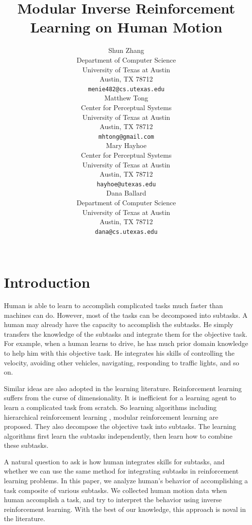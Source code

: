 \documentclass[11pt]{article} %
\title{Modular Inverse Reinforcement Learning on Human Motion}
\author{
Shun Zhang\\
Department of Computer Science\\
University of Texas at Austin\\
Austin, TX 78712 \\
\texttt{menie482@cs.utexas.edu} \\
\And
Matthew Tong \\
Center for Perceptual Systems\\
University of Texas at Austin\\
Austin, TX 78712 \\
\texttt{mhtong@gmail.com} \\
\AND
Mary Hayhoe \\
Center for Perceptual Systems\\
University of Texas at Austin\\
Austin, TX 78712 \\
\texttt{hayhoe@utexas.edu} \\
\And
Dana Ballard \\
Department of Computer Science\\
University of Texas at Austin\\
Austin, TX 78712 \\
\texttt{dana@cs.utexas.edu} \\
\\
}
\begin{document}
\maketitle

\begin{abstract}
\end{abstract}


\startmain %

\section{Introduction}

Human is able to learn to accomplish complicated tasks much faster than machines
can do. However, most of the tasks can be decomposed into subtasks. A human may
already have the capacity to accomplish the subtasks. He simply transfers the
knowledge of the subtasks and integrate them for the objective task. For example,
when a human learns to drive, he has much prior domain knowledge to help him
with this objective task. He integrates his skills of controlling the velocity,
avoiding other vehicles, navigating, responding to traffic lights, and so on.

Similar ideas are also adopted in the learning literature. Reinforcement learning
suffers from the curse of dimensionality. It is inefficient for a learning agent
to learn a complicated task from scratch. So learning algorithms including
hierarchical reinforcement learning \cite{dietterich2000hierarchical}, modular
reinforcement learning \cite{sprague2003multiple} are proposed. They also
decompose the objective task into subtasks. The learning algorithms first learn
the subtasks independently, then learn how to combine these subtasks.

A natural question to ask is how human integrates skills for subtasks, and
whether we can use the same method for integrating subtasks in reinforcement
learning problems. In this paper, we analyze human's behavior of
accomplishing a task composite of various subtasks. We collected human motion
data when human accomplish a task, and try to interpret the behavior using
inverse reinforcement learning. With the best of our knowledge, this approach is
noval in the literature.
\end{document}
